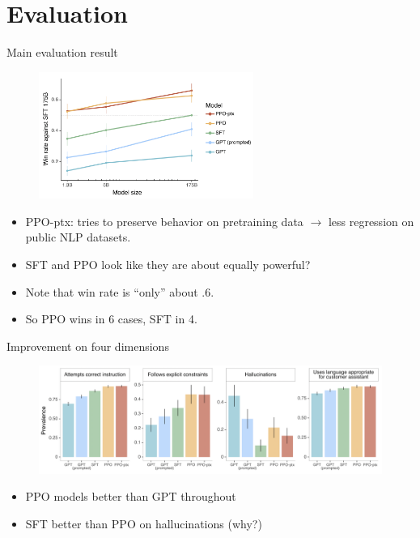 


\section{Evaluation}





\begin{vbframe}{Main evaluation result}

\vfill

\begin{figure}
\centering
\includegraphics[width = 7cm]{figure/mainresult.png}
\end{figure}

\begin{itemize}
	\item PPO-ptx: tries to preserve behavior on
	pretraining data $\rightarrow$ less regression on
	public NLP datasets.
	\item SFT and PPO look like they are about equally
	powerful?
        \item Note that win rate is ``only'' about .6.
        \item So PPO wins in 6 cases, SFT in 4.
\end{itemize}

\vfill

\end{vbframe}

\begin{vbframe}{Improvement on four dimensions}

\vfill

\begin{figure}
\centering
\includegraphics[width = 12cm]{figure/evaluationon4categories.png}
\end{figure}

\begin{itemize}
	\item PPO models better than GPT throughout
	\item SFT better than PPO on hallucinations (why?)
\end{itemize}

\vfill

\end{vbframe}

